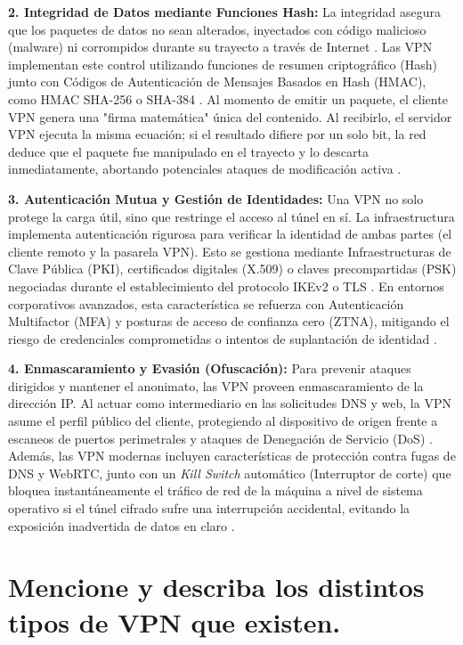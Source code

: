 \documentclass[a4paper,12pt]{article}
\begin{document}
\textbf{2. Integridad de Datos mediante Funciones Hash:}
La integridad asegura que los paquetes de datos no sean alterados, inyectados con código malicioso (malware) ni corrompidos durante su trayecto a través de Internet \cite{cisco_vpn_ccna}. Las VPN implementan este control utilizando funciones de resumen criptográfico (Hash) junto con Códigos de Autenticación de Mensajes Basados en Hash (HMAC), como HMAC SHA-256 o SHA-384 \cite{protonvpn_protocols}. Al momento de emitir un paquete, el cliente VPN genera una "firma matemática" única del contenido. Al recibirlo, el servidor VPN ejecuta la misma ecuación; si el resultado difiere por un solo bit, la red deduce que el paquete fue manipulado en el trayecto y lo descarta inmediatamente, abortando potenciales ataques de modificación activa \cite{netwrix_cia}.

\textbf{3. Autenticación Mutua y Gestión de Identidades:}
Una VPN no solo protege la carga útil, sino que restringe el acceso al túnel en sí. La infraestructura implementa autenticación rigurosa para verificar la identidad de ambas partes (el cliente remoto y la pasarela VPN). Esto se gestiona mediante Infraestructuras de Clave Pública (PKI), certificados digitales (X.509) o claves precompartidas (PSK) negociadas durante el establecimiento del protocolo IKEv2 o TLS \cite{cisco_vpn_technologies}. En entornos corporativos avanzados, esta característica se refuerza con Autenticación Multifactor (MFA) y posturas de acceso de confianza cero (ZTNA), mitigando el riesgo de credenciales comprometidas o intentos de suplantación de identidad \cite{zscaler_vpn, fortinet_site}.

\textbf{4. Enmascaramiento y Evasión (Ofuscación):}
Para prevenir ataques dirigidos y mantener el anonimato, las VPN proveen enmascaramiento de la dirección IP. Al actuar como intermediario en las solicitudes DNS y web, la VPN asume el perfil público del cliente, protegiendo al dispositivo de origen frente a escaneos de puertos perimetrales y ataques de Denegación de Servicio (DoS) \cite{aws_vpn, ibm_vpn}. Además, las VPN modernas incluyen características de protección contra fugas de DNS y WebRTC, junto con un \textit{Kill Switch} automático (Interruptor de corte) que bloquea instantáneamente el tráfico de red de la máquina a nivel de sistema operativo si el túnel cifrado sufre una interrupción accidental, evitando la exposición inadvertida de datos en claro \cite{gizmodo_vpn}.


\newpage
\section{Mencione y describa los distintos tipos de VPN que existen.}
\end{document}
